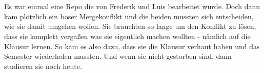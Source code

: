 
\newcommand{\germanQuote}[1]{„\textit{#1}“}
\newcommand{\englishQuote}[1]{``\textit{#1}''}



\chapter{\chapterTwo}
Es war einmal eine Repo die von Frederik und Luis bearbeitet wurde.
Doch dann kam plötzlich ein böser Mergekonflikt und die beiden mussten sich entscheiden, wie sie damit umgehen wollen.
Sie brauchten so lange um den Konflikt zu lösen, dass sie komplett vergaßen was sie eigentlich machen wollten - nämlich auf die Klausur lernen.
So kam es also dazu, dass sie die Klausur verhaut haben und das Semester wiederholen mussten.
Und wenn sie nicht gestorben sind, dann studieren sie noch heute.

